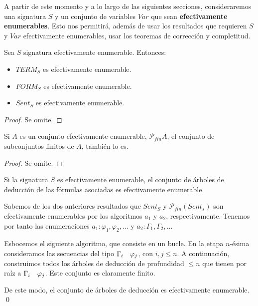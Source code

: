 A partir de este momento y a lo largo de las siguientes secciones, consideraremos una signatura $S$ y un conjunto de variables $Var$ que sean \textbf{efectivamente enumerables}. Esto nos permitirá, además de usar los resultados que requieren $S$ y $Var$ efectivamente enumerables, usar los teoremas de corrección  y completitud.

\begin{lema*}\label{cosasenum}
Sea $S$ signatura efectivamente enumerable. Entonces:
\begin{itemize}
    \item $TERM_S$ es efectivamente enumerable.
    \item $FORM_S$ es efectivamente enumerable.
    \item $Sent_S$ es efectivamente enumerable.
\end{itemize}
\end{lema*}
\begin{proof}
Se omite.
\end{proof}

\begin{lema*}
Si $A$ es un conjunto efectivamente enumerable, $\mathcal{P}_{fin}A$, el conjunto de subconjuntos  finitos de $A$, también lo es.
\end{lema*}
\begin{proof}
Se omite.
\end{proof}

\begin{prop*}\label{arbenum}
Si la signatura $S$ es efectivamente enumerable, el conjunto de árboles de deducción de las fórmulas asociadas es efectivamente enumerable.
\end{prop*}
\begin{sketchproof}
Sabemos de los dos anteriores resultados que $Sent_S$ y $\mathcal{P}_{fin}(Sent_s)$ son efectivamente enumerables por los algoritmos $a_1$ y $a_2$, respectivamente. Tenemos por tanto las enumeraciones $a_1: \varphi_1, \varphi_2, \dots$ y $a_2: \Gamma_1, \Gamma_2, \dots$

Esbocemos el siguiente algoritmo, que consiste en un bucle. En la etapa $n$-ésima consideramos las secuencias del tipo $\Gamma_i \quad \varphi_j$, con $i, j \leq n$. A continuación, construimos todos los árboles de deducción de profundidad $\leq n$ que tienen por raíz a $\Gamma_i \quad \varphi_j$. Este conjunto es claramente finito.

De este modo, el conjunto de árboles de deducción es efectivamente enumerable.
\qed
\end{sketchproof}


